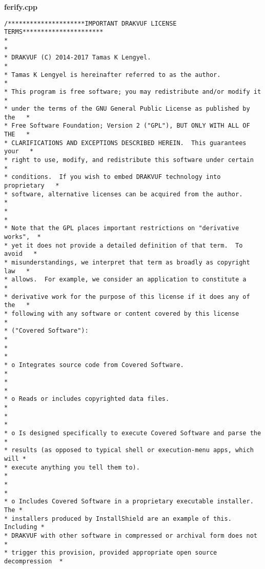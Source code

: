 \newpage
{}\selectfont
\textbf{ferify.cpp}
\footnotesize{\selectfont
\begin{lstlisting}[style=CStyle]
/*********************IMPORTANT DRAKVUF LICENSE TERMS**********************
*                                                                         *
* DRAKVUF (C) 2014-2017 Tamas K Lengyel.                                  *
* Tamas K Lengyel is hereinafter referred to as the author.               *
* This program is free software; you may redistribute and/or modify it    *
* under the terms of the GNU General Public License as published by the   *
* Free Software Foundation; Version 2 ("GPL"), BUT ONLY WITH ALL OF THE   *
* CLARIFICATIONS AND EXCEPTIONS DESCRIBED HEREIN.  This guarantees your   *
* right to use, modify, and redistribute this software under certain      *
* conditions.  If you wish to embed DRAKVUF technology into proprietary   *
* software, alternative licenses can be acquired from the author.         *
*                                                                         *
* Note that the GPL places important restrictions on "derivative works",  *
* yet it does not provide a detailed definition of that term.  To avoid   *
* misunderstandings, we interpret that term as broadly as copyright law   *
* allows.  For example, we consider an application to constitute a        *
* derivative work for the purpose of this license if it does any of the   *
* following with any software or content covered by this license          *
* ("Covered Software"):                                                   *
*                                                                         *
* o Integrates source code from Covered Software.                         *
*                                                                         *
* o Reads or includes copyrighted data files.                             *
*                                                                         *
* o Is designed specifically to execute Covered Software and parse the    *
* results (as opposed to typical shell or execution-menu apps, which will *
* execute anything you tell them to).                                     *
*                                                                         *
* o Includes Covered Software in a proprietary executable installer.  The *
* installers produced by InstallShield are an example of this.  Including *
* DRAKVUF with other software in compressed or archival form does not     *
* trigger this provision, provided appropriate open source decompression  *

\end{lstlisting}}
